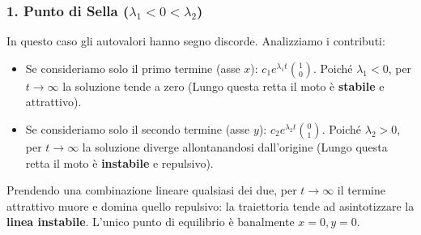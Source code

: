 \documentclass[openany]{book}
\theoremstyle{definition}
\theoremstyle{remark}
\begin{document}
\subsubsection*{1. Punto di Sella ($\lambda_1 < 0 < \lambda_2$)}
In questo caso gli autovalori hanno segno discorde. Analizziamo i contributi:
\begin{itemize}
    \item Se consideriamo solo il primo termine (asse $x$): $c_1 e^{\lambda_1 t} \binom{1}{0}$. Poiché $\lambda_1 < 0$, per $t \to \infty$ la soluzione tende a zero (Lungo questa retta il moto è \textbf{stabile} e attrattivo).
    \item Se consideriamo solo il secondo termine (asse $y$): $c_2 e^{\lambda_2 t} \binom{0}{1}$. Poiché $\lambda_2 > 0$, per $t \to \infty$ la soluzione diverge allontanandosi dall'origine (Lungo questa retta il moto è \textbf{instabile} e repulsivo).
\end{itemize}
Prendendo una combinazione lineare qualsiasi dei due, per $t \to \infty$ il termine attrattivo muore e domina quello repulsivo: la traiettoria tende ad asintotizzare la \textbf{linea instabile}. L'unico punto di equilibrio è banalmente $x=0, y=0$.

\begin{center}
\end{center}
\end{document}
